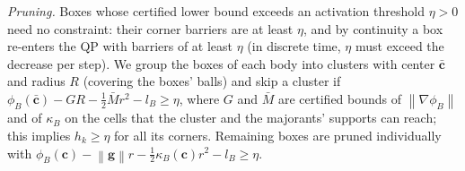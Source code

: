 \documentclass[journal]{IEEEtran}
\theoremstyle{definition}
\newcommand{\norm}[1]{\left\lVert #1\right\rVert}
\begin{document}
\emph{Pruning.} Boxes whose certified lower bound exceeds an activation threshold $\eta>0$ need no
constraint: their corner barriers are at least $\eta$, and by continuity a box re-enters the QP with
barriers of at least $\eta$ (in discrete time, $\eta$ must exceed the decrease per step). We group the boxes of
each body into clusters with center $\bar{\mathbf c}$ and radius $R$ (covering the boxes' balls) and
skip a cluster if $\phi_B(\bar{\mathbf c})-GR-\tfrac12\bar M r^2-l_B\ge\eta$, where $G$ and $\bar M$
are certified bounds of $\norm{\nabla\phi_B}$ and of $\kappa_B$ on the cells that the cluster and the
majorants' supports can reach; this implies $h_k\ge\eta$ for all its corners. Remaining boxes are
pruned individually with $\phi_B(\mathbf c)-\norm{\mathbf g}r-\tfrac12\kappa_B(\mathbf c)r^2-l_B\ge\eta$.

\end{document}
